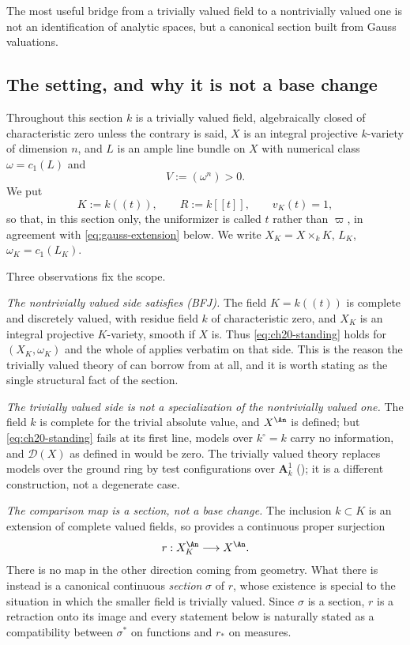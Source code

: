 The most useful bridge from a trivially valued field to a nontrivially
valued one is not an identification of analytic spaces, but a canonical
section built from Gauss valuations.

\subsection{The setting, and why it is not a base change}
\label{sec:ch30-gauss-setting}

Throughout this section \(k\) is a trivially valued field, algebraically
closed of characteristic zero unless the contrary is said, \(X\) is an
integral projective \(k\)-variety of dimension \(n\), and \(L\) is an ample
line bundle on \(X\) with numerical class \(\omega=c_1(L)\) and
\[
                       V:=(\omega^n)>0 .
\]
We put
\[
 K:=k(\!(t)\!),\qquad R:=k[\![t]\!],\qquad v_K(t)=1,
\]
so that, in this section only, the uniformizer is called \(t\) rather than
\(\varpi\), in agreement with \eqref{eq:gauss-extension} below.  We write
\(X_K=X\times_kK\), \(L_K\), \(\omega_K=c_1(L_K)\).

Three observations fix the scope.

\emph{The nontrivially valued side satisfies \textup{(BFJ)}.}  The field
\(K=k(\!(t)\!)\) is complete and discretely valued, with residue field
\(k\) of characteristic zero, and \(X_K\) is an integral projective
\(K\)-variety, smooth if \(X\) is.  Thus \eqref{eq:ch20-standing} holds for
\((X_K,\omega_K)\) and the whole of
 applies verbatim on
that side.  This is the reason the trivially valued theory of
 can borrow from  at all, and it is worth
stating as the single structural fact of the section.

\emph{The trivially valued side is not a specialization of the
nontrivially valued one.}  The field \(k\) is complete for the trivial
absolute value, and \(X^{\An}\) is defined; but \eqref{eq:ch20-standing}
fails at its first line, models over \(k^\circ=k\) carry no information,
and \(\mathcal D(X)\) as defined in  would be
zero.  The trivially valued theory replaces models over the ground ring by
test configurations over \(\mathbf A^1_k\)
(); it is a different construction, not a
degenerate case.

\emph{The comparison map is a section, not a base change.}  The inclusion
\(k\subset K\) is an extension of complete valued fields, so
 provides a continuous proper surjection
\[
 r:X_K^{\An}\longrightarrow X^{\An} .
\]
There is no map in the other direction coming from geometry.  What there is
instead is a canonical continuous \emph{section} \(\sigma\) of \(r\), whose
existence is special to the situation in which the smaller field is
trivially valued.  Since \(\sigma\) is a section, \(r\) is a retraction onto
its image and every statement below is naturally stated as a compatibility
between \(\sigma^*\) on functions and \(r_*\) on measures.

